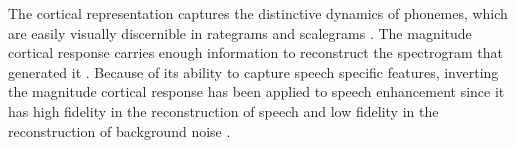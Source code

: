 \documentclass{article}
\begin{document}
The cortical representation captures the distinctive dynamics of phonemes, which are easily visually discernible in rategrams and scalegrams \cite{mesgarani_2011}.
The magnitude cortical response carries enough information to reconstruct the spectrogram that generated it \cite{chi_2005}.
Because of its ability to capture speech specific features, inverting the magnitude cortical response has been applied to speech enhancement since it has high fidelity in the reconstruction of speech and low fidelity in the reconstruction of background noise \cite{mesgarani_2007}.
%
%
%
\end{document}
